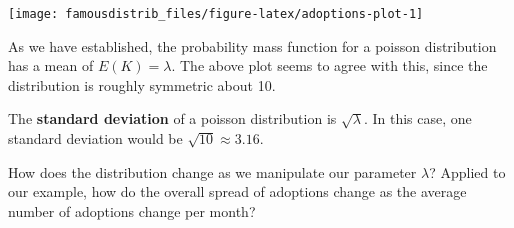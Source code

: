 \documentclass[
]{article}
\newenvironment{Shaded}{\begin{snugshade}}{\end{snugshade}}
\newcommand{\AttributeTok}[1]{\textcolor[rgb]{0.77,0.63,0.00}{#1}}
\newcommand{\DecValTok}[1]{\textcolor[rgb]{0.00,0.00,0.81}{#1}}
\newcommand{\FloatTok}[1]{\textcolor[rgb]{0.00,0.00,0.81}{#1}}
\newcommand{\FunctionTok}[1]{\textcolor[rgb]{0.00,0.00,0.00}{#1}}
\newcommand{\NormalTok}[1]{#1}
\newcommand{\OtherTok}[1]{\textcolor[rgb]{0.56,0.35,0.01}{#1}}
\newcommand{\SpecialCharTok}[1]{\textcolor[rgb]{0.00,0.00,0.00}{#1}}
\newcommand{\StringTok}[1]{\textcolor[rgb]{0.31,0.60,0.02}{#1}}
\begin{document}
\begin{Shaded}
\end{Shaded}

\begin{center}\texttt{[image: famousdistrib\_files/figure-latex/adoptions-plot-1]} \end{center}

As we have established, the probability mass function for a poisson distribution has a mean of \(E(K) = \lambda\). The above plot seems to agree with this, since the distribution is roughly symmetric about 10.

The \textbf{standard deviation} of a poisson distribution is \(\sqrt{\lambda}\). In this case, one standard deviation would be \(\sqrt{10}\approx3.16\).

How does the distribution change as we manipulate our parameter \(\lambda\)? Applied to our example, how do the overall spread of adoptions change as the average number of adoptions change per month?
\end{document}
